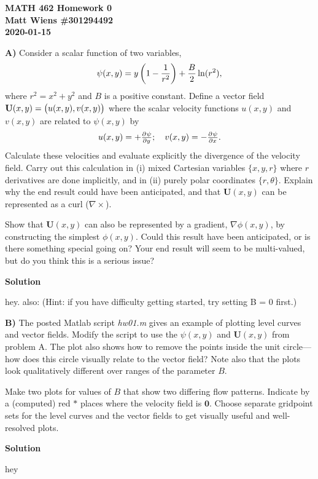 \documentclass{article}
\def\*#1{\mathbf{#1}}
\begin{document}
\textbf{MATH 462 Homework 0} \\
\textbf{Matt Wiens \#301294492} \\
\textbf{2020-01-15}

\textbf{A)} Consider a scalar function of two variables,
%
\begin{equation*}
    \psi(x, y) = y \del{1 - \frac{1}{r^2}} + \frac{B}{2} \ln(r^2)
    ,
\end{equation*}
%
where $r^2 = x^2 + y^2$ and $B$ is a positive constant. Define a vector
field $\*U(x, y) = \del{u(x, y), v(x, y)}$ where the scalar velocity
functions $u(x, y)$ and $v(x, y)$ are related to $\psi(x, y)$ by
%
\begin{equation*}
    u(x, y) = + \pd{\psi}{y}; \quad v(x, y) = - \pd{\psi}{x}.
\end{equation*}
%
Calculate these velocities and evaluate explicitly the divergence of the
velocity field. Carry out this calculation in (i) mixed Cartesian
variables $\{x, y, r\}$ where $r$ derivatives are done implicitly, and
in (ii) purely polar coordinates $\{r, \theta\}$. Explain why the end
result could have been anticipated, and that $\*U(x, y)$ can be
represented as a curl ($\nabla \times$).


Show that $\*U(x, y)$ can also be represented by a gradient, $\nabla
\phi(x, y)$, by constructing the simplest $\phi(x, y)$. Could this
result have been anticipated, or is there something special going on?
Your end result will seem to be multi-valued, but do you think this is a
serious issue?

\textbf{Solution}

hey. also: (Hint: if you have difficulty getting started, try setting B
= 0 first.)

\newpage

\textbf{B)} The posted Matlab script \textit{hw01.m} gives an example of
plotting level curves and vector fields. Modify the script to use the
$\psi(x, y)$ and $\*U(x, y)$ from problem A. The plot also
shows how to remove the points inside the unit circle---how does this
circle visually relate to the vector field? Note also that the plots
look qualitatively different over ranges of the parameter $B$.

Make two plots for values of $B$ that show two differing flow patterns.
Indicate by a (computed) red $\ast$ places where the velocity field is
$\*0$. Choose separate gridpoint sets for the level curves and the
vector fields to get visually useful and well-resolved plots.

\textbf{Solution}

hey
\end{document}
